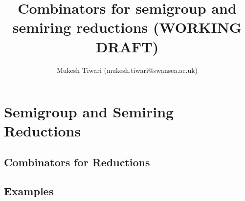 \documentclass{article}
\title{Combinators for semigroup and semiring reductions (WORKING DRAFT)}
\author{Mukesh Tiwari (mukesh.tiwari@swansea.ac.uk)}
\begin{document}
\maketitle

\begin{abstract}
   
\end{abstract}

\section{Semigroup and Semiring Reductions}
\label{sec:reductions}
 

\subsection{Combinators for Reductions}
\label{sec:combinators}
 


\subsection{Examples}
\label{sec:examples}
 




\end{document}
